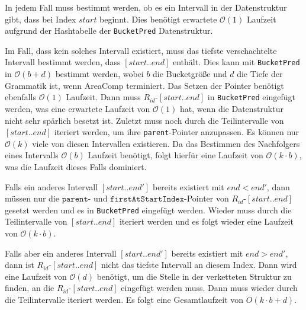 In jedem Fall muss bestimmt werden, ob es ein Intervall in der Datenstruktur gibt, dass bei Index $start$ beginnt. Dies benötigt erwartete $\mathcal{O}(1)$ Laufzeit aufgrund der Hashtabelle der \texttt{BucketPred} Datenstruktur. 

Im Fall, dass kein solches Intervall existiert, muss das tiefste verschachtelte Intervall bestimmt werden, dass $[start..end]$ enthält. Dies kann mit \texttt{BucketPred} in $\mathcal{O}(b + d)$ bestimmt werden, wobei $b$ die Bucketgröße und $d$ die Tiefe der Grammatik ist, wenn AreaComp terminiert. Das Setzen der Pointer benötigt ebenfalls $\mathcal{O}(1)$ Laufzeit. 
Dann muss $R_{id}$-$[start..end]$ in \texttt{BucketPred} eingefügt werden, was eine erwartete Laufzeit von $\mathcal{O}(1)$ hat, wenn die Datenstruktur nicht sehr spärlich besetzt ist. Zuletzt muss noch durch die Teilintervalle von $[start..end]$ iteriert werden, um ihre \texttt{parent}-Pointer anzupassen. Es können nur $\mathcal{O}(k)$ viele von diesen Intervallen existieren. Da das Bestimmen des Nachfolgers eines Intervalls $\mathcal{O}(b)$ Laufzeit benötigt, folgt hierfür eine Laufzeit von $\mathcal{O}(k \cdot b)$, was die Laufzeit dieses Falls dominiert.

Falls ein anderes Intervall $[start..end']$ bereits existiert mit $end < end'$, dann müssen nur die $\texttt{parent}$- und $\texttt{firstAtStartIndex}$-Pointer von $R_{id}$-$[start..end]$ gesetzt werden und es in \texttt{BucketPred} eingefügt werden. Wieder muss durch die Teilintervalle von $[start..end]$ iteriert werden und es folgt wieder eine Laufzeit von $\mathcal{O}(k \cdot b)$.

Falls aber ein anderes Intervall $[start..end']$ bereits existiert mit $end > end'$, dann ist $R_{id}$-$[start..end]$ nicht das tiefste Intervall an diesem Index. Dann wird eine Laufzeit von $\mathcal{O}(d)$ benötigt, um die Stelle in der verketteten Struktur zu finden, an die $R_{id}$-$[start..end]$ eingefügt werden muss. Dann muss wieder durch die Teilintervalle iteriert werden.
Es folgt eine Gesamtlaufzeit von ${O}(k \cdot b + d)$.